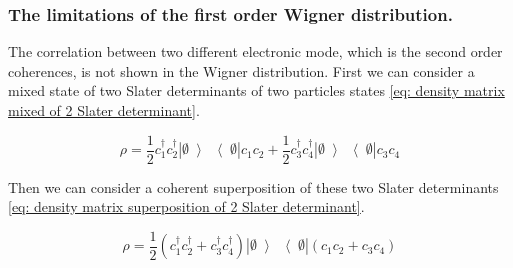 
\subsubsection*{The limitations of the first order Wigner distribution.}


The correlation between two different electronic mode, which is the second order coherences, is not shown in the Wigner distribution.
First we can consider a mixed state of two Slater determinants of two particles states \eqref{eq: density matrix mixed of 2 Slater determinant}.

\begin{equation}
\rho = \frac{1}{2}c^{\dagger}_{1}c^{\dagger}_{2}\left|\emptyset\left>\right<\emptyset\right|c_{1}c_{2}+\frac{1}{2}c^{\dagger}_{3}c^{\dagger}_{4}\left|\emptyset\left>\right<\emptyset\right|c_{3}c_{4} \label{eq: density matrix mixed of 2 Slater determinant}
\end{equation}

Then we can consider a coherent superposition of these two Slater determinants \eqref{eq: density matrix superposition of 2 Slater determinant}.

\begin{equation}
\rho = \frac{1}{2}\left(c^{\dagger}_{1}c^{\dagger}_{2}+c^{\dagger}_{3}c^{\dagger}_{4}\right)\left|\emptyset\left>\right<\emptyset\right|\left(c_{1}c_{2}+c_{3}c_{4}\right) \label{eq: density matrix superposition of 2 Slater determinant}
\end{equation}

